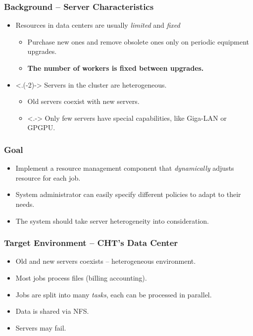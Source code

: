 \begin{frame}
  \frametitle{Background -- Server Characteristics}
  \begin{itemize}[<+->]
    \item Resources in data centers are usually \emph{limited} and
      \emph{fixed}
      \begin{itemize}
        \item Purchase new ones and remove obsolete ones only on
          periodic equipment upgrades.
        \item \textbf{The number of workers is fixed between upgrades.}
      \end{itemize}
    \item <.(-2)-> Servers in the cluster are \alert{heterogeneous}.
      \begin{itemize}
        \item Old servers coexist with new servers.
        \item <.-> Only few servers have special capabilities, like Giga-LAN
          or GPGPU.
      \end{itemize}
  \end{itemize}
\end{frame}
\begin{frame}
  \frametitle{Goal}
  \begin{itemize}
    \item Implement a resource management component that \emph{dynamically}
      adjusts resource for each job.
    \item System administrator can easily specify different policies to
      adapt to their needs.
    \item The system should take server \alert{heterogeneity} into consideration.
  \end{itemize}
\end{frame}
\begin{frame}
  \frametitle{Target Environment -- CHT's Data Center}
  \begin{itemize}
    \item Old and new servers coexists -- heterogeneous environment.
    \item Most jobs process files (billing accounting).
    \item Jobs are split into many \emph{tasks}, each can be processed
      in parallel.
    \item Data is shared via NFS.
    \item Servers may fail.
  \end{itemize}
\end{frame}

